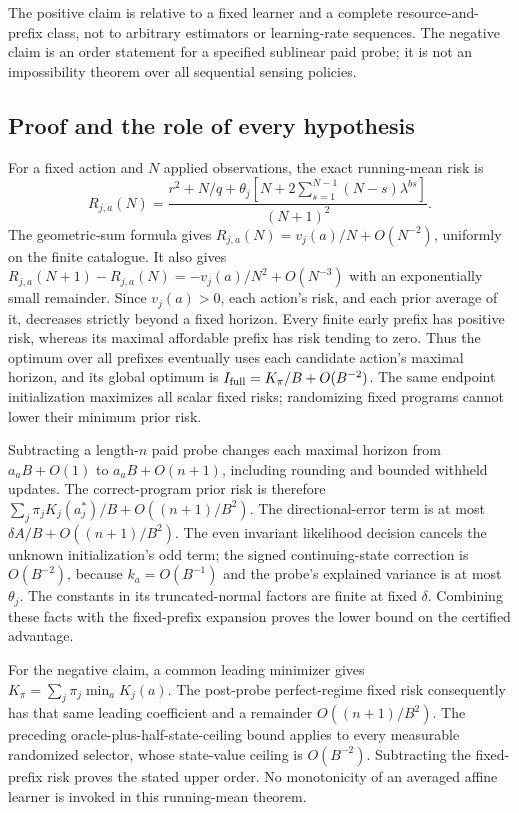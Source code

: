 The positive claim is relative to a fixed learner and a complete resource-and-
prefix class, not to arbitrary estimators or learning-rate sequences.
The negative claim is an order statement for a specified sublinear paid probe;
it is not an impossibility theorem over all sequential sensing policies.

\subsection{Proof and the role of every hypothesis}
For a fixed action and $N$ applied observations, the exact running-mean risk is
\[
R_{j,a}(N)=\frac{r^2+N/q+
\theta_j[N+2\sum_{s=1}^{N-1}(N-s)\lambda^{bs}]}{(N+1)^2}.
\]
The geometric-sum formula gives
$R_{j,a}(N)=v_j(a)/N+O(N^{-2})$, uniformly on the finite catalogue.
It also gives
$R_{j,a}(N+1)-R_{j,a}(N)=-v_j(a)/N^2+O(N^{-3})$
with an exponentially small remainder.
Since $v_j(a)>0$, each action's risk, and each prior average of it, decreases
strictly beyond a fixed horizon.
Every finite early prefix has positive risk, whereas its maximal affordable
prefix has risk tending to zero.
Thus the optimum over all prefixes eventually uses each candidate action's
maximal horizon, and its global optimum is
$I_{\rm full}=K_\pi/B+O(B^{-2})$.
The same endpoint initialization maximizes all scalar fixed risks; randomizing
fixed programs cannot lower their minimum prior risk.

Subtracting a length-$n$ paid probe changes each maximal horizon from
$a_aB+O(1)$ to $a_aB+O(n+1)$, including rounding and bounded withheld updates.
The correct-program prior risk is therefore
$\sum_j\pi_jK_j(a_j^*)/B+O((n+1)/B^2)$.
The directional-error term is at most $\delta A/B+O((n+1)/B^2)$.
The even invariant likelihood decision cancels the unknown initialization's
odd term; the signed continuing-state correction is $O(B^{-2})$, because
$k_a=O(B^{-1})$ and the probe's explained variance is at most $\theta_j$.
The constants in its truncated-normal factors are finite at fixed $\delta$.
Combining these facts with the fixed-prefix expansion proves the lower bound
on the certified advantage.

For the negative claim, a common leading minimizer gives
$K_\pi=\sum_j\pi_j\min_aK_j(a)$.
The post-probe perfect-regime fixed risk consequently has that same leading
coefficient and a remainder $O((n+1)/B^2)$.
The preceding oracle-plus-half-state-ceiling bound applies to every measurable
randomized selector, whose state-value ceiling is $O(B^{-2})$.
Subtracting the fixed-prefix risk proves the stated upper order.
No monotonicity of an averaged affine learner is invoked in this running-mean
theorem.

